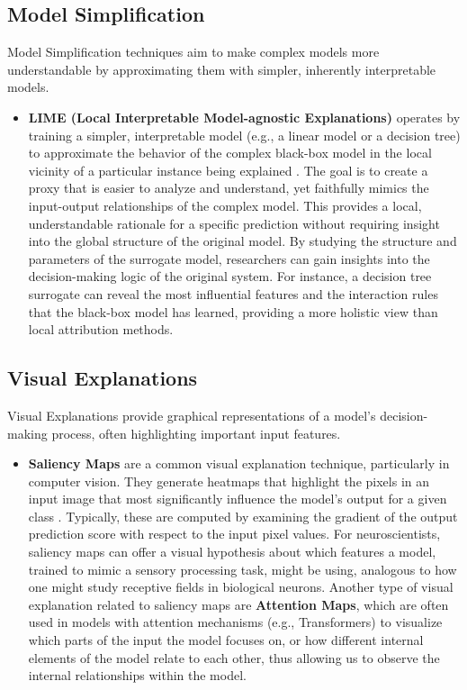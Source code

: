 \subsection{Model Simplification}
Model Simplification techniques aim to make complex models more understandable by approximating them with simpler, inherently interpretable models.
\begin{itemize}
    \item \textbf{LIME (Local Interpretable Model-agnostic Explanations)} operates by training a simpler, interpretable model (e.g., a linear model or a decision tree) to approximate the behavior of the complex black-box model in the local vicinity of a particular instance being explained \cite{ribeiro2016why}. The goal is to create a proxy that is easier to analyze and understand, yet faithfully mimics the input-output relationships of the complex model. This provides a local, understandable rationale for a specific prediction without requiring insight into the global structure of the original model. By studying the structure and parameters of the surrogate model, researchers can gain insights into the decision-making logic of the original system. For instance, a decision tree surrogate can reveal the most influential features and the interaction rules that the black-box model has learned, providing a more holistic view than local attribution methods.
\end{itemize}

\subsection{Visual Explanations}
Visual Explanations provide graphical representations of a model's decision-making process, often highlighting important input features.
\begin{itemize}
    \item \textbf{Saliency Maps} are a common visual explanation technique, particularly in computer vision. They generate heatmaps that highlight the pixels in an input image that most significantly influence the model's output for a given class \cite{fong2017interpretable}. Typically, these are computed by examining the gradient of the output prediction score with respect to the input pixel values. For neuroscientists, saliency maps can offer a visual hypothesis about which features a model, trained to mimic a sensory processing task, might be using, analogous to how one might study receptive fields in biological neurons. Another type of visual explanation related to saliency maps are \textbf{Attention Maps}, which are often used in models with attention mechanisms (e.g., Transformers) to visualize which parts of the input the model focuses on, or how different internal elements of the model relate to each other, thus allowing us to observe the internal relationships within the model.
\end{itemize}

